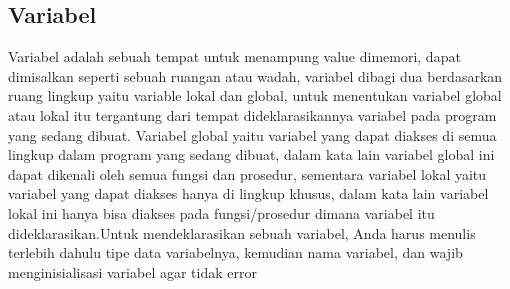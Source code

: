 \subsection{Variabel}
Variabel adalah sebuah tempat untuk menampung value dimemori, dapat dimisalkan seperti sebuah ruangan atau wadah, variabel dibagi dua berdasarkan ruang lingkup yaitu variable lokal dan global, untuk menentukan variabel global atau lokal itu tergantung dari tempat dideklarasikannya variabel pada program yang sedang dibuat. Variabel global yaitu variabel yang dapat diakses di semua lingkup dalam program yang sedang dibuat, dalam kata lain variabel global ini dapat dikenali oleh semua fungsi dan prosedur, sementara variabel lokal yaitu variabel yang dapat diakses hanya di lingkup khusus, dalam kata lain variabel lokal ini hanya bisa diakses pada fungsi/prosedur dimana variabel itu dideklarasikan.Untuk mendeklarasikan sebuah variabel, Anda harus menulis terlebih dahulu tipe data variabelnya, kemudian nama variabel, dan wajib menginisialisasi variabel agar tidak error

